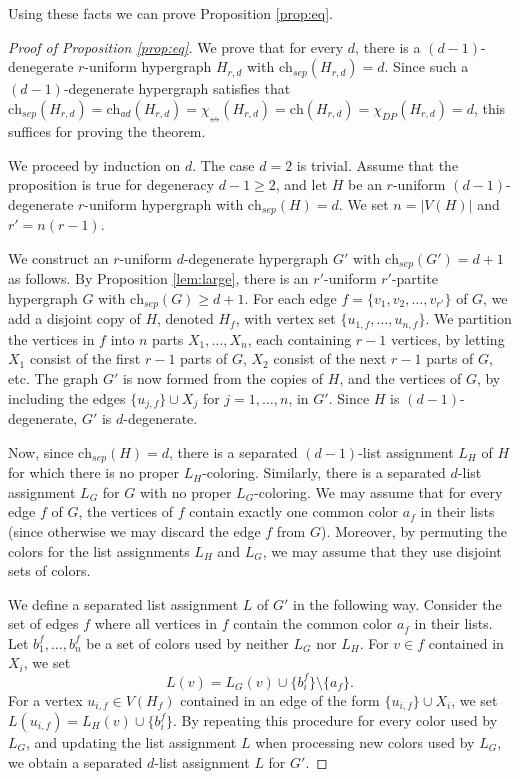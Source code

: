 \documentclass[12pt]{article}
\newcommand{\single}{\chi_{\nleftrightarrow}}
\newcommand{\ch}{\mathrm{ch}}
\newcommand{\1}{\mathds{1}}
\begin{document}
	Using these facts we can prove Proposition \ref{prop:eq}.
	\begin{proof}[Proof of Proposition \ref{prop:eq}]
		We prove that for every $d$, there is a $(d-1)$-denegerate
		$r$-uniform hypergraph $H_{r,d}$ with $\ch_{sep}(H_{r,d}) = d$.
		Since such a $(d-1)$-degenerate hypergraph satisfies that
		$\ch_{sep}(H_{r,d}) = \ch_{ad}(H_{r,d}) = 
		\single(H_{r,d})= \ch(H_{r,d}) = \chi_{DP}(H_{r,d})= d$, this suffices for proving 
		the theorem.
		
		We proceed by induction on $d$. The case $d=2$ is trivial.
		Assume that the proposition is true for degeneracy $d-1 \geq 2$, and
		let $H$ be an $r$-uniform $(d-1)$-degenerate $r$-uniform 
		hypergraph with $\ch_{sep}(H)=d$. We set $n = |V(H)|$
	and $r' = n(r-1)$.


	We construct
	an $r$-uniform $d$-degenerate hypergraph $G'$ 
	with $\ch_{sep}(G')=d+1$ as follows. 
	By Proposition \ref{lem:large}, there is an $r'$-uniform $r'$-partite hypergraph $G$
	with $\ch_{sep}(G) \geq d+1$.
	For each edge $f = \{v_1,v_2, \dots, v_{r'}\}$ of $G$, we add
	a disjoint copy of $H$, denoted $H_f$, with vertex set
	$\{u_{1,f}, \dots, u_{n,f}\}$. We partition the vertices in $f$
	into $n$ parts $X_1,\dots, X_n$, each containing $r-1$ vertices,
	by letting $X_1$ consist of the first $r-1$ parts of $G$, $X_2$ consist of the next $r-1$ parts of $G$, etc.
	The graph $G'$ is now formed from the copies of $H$, and the
	vertices of $G$, by including the edges $\{u_{j,f}\} \cup X_j$
	for $j=1,\dots, n$, in $G'$.
	Since $H$ is $(d-1)$-degenerate, $G'$ is $d$-degenerate.

	Now, since $\ch_{sep}(H) = d$, there is a separated 
	$(d-1)$-list assignment $L_H$
	of $H$ for which there is no proper $L_H$-coloring. 
	Similarly, there is a separated
	$d$-list assignment $L_G$ for $G$ with no proper $L_G$-coloring.
	We may assume that for every edge $f$ of $G$, the
	vertices of $f$ contain exactly one common color $a_f$ in their lists
	(since otherwise we may discard the edge $f$ from $G$).
	Moreover, by permuting the colors for the list assignments
	$L_H$ and $L_G$, we may assume that they use disjoint sets of colors.

	We define a separated list assignment $L$ of $G'$ in the following way.
	Consider the set of edges $f$ where all vertices in $f$ contain the common color $a_f$ in their lists.
	Let $b^f_1,\dots, b^f_n$ be a set of colors  used by neither $L_G$ nor $L_H$.
	For $v \in f$ contained in $X_i$, 
	we set $$L(v)=L_G(v) \cup \{b^f_i \} \setminus \{a_f\}.$$
	For a vertex $u_{i,f} \in V(H_f)$ contained in an edge of the form 
	$\{u_{i,f}\} \cup X_i$, we set $L(u_{i,f}) = L_H(v) \cup \{b^f_i\}$.
	By repeating this procedure for every color used by $L_G$, and updating the list assignment $L$ when
	processing new colors used by $L_G$,
	we obtain a separated $d$-list assignment $L$ for $G'$.
	

\end{proof}
\end{document}
